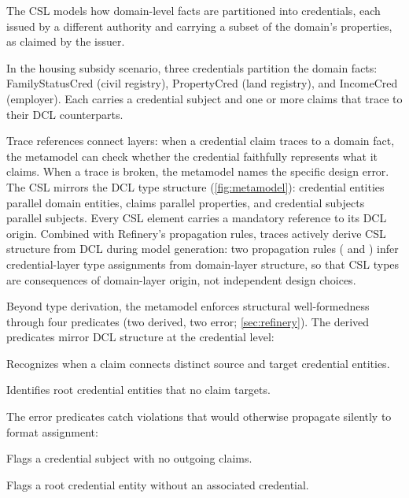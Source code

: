 The \acf{CSL} models how domain-level facts are partitioned into credentials, each issued by a different authority and carrying a subset of the domain's properties, as claimed by the issuer.

In the housing subsidy scenario, three credentials partition the domain facts: FamilyStatusCred (civil registry), PropertyCred (land registry), and IncomeCred (employer). Each carries a credential subject and one or more claims that trace to their \ac{DCL} counterparts.

Trace references connect layers: when a credential claim traces to a domain fact, the metamodel can check whether the credential faithfully represents what it claims. When a trace is broken, the metamodel names the specific design error. The \ac{CSL} mirrors the \ac{DCL} type structure (\autoref{fig:metamodel}): credential entities parallel domain entities, claims parallel properties, and credential subjects parallel subjects. Every \ac{CSL} element carries a mandatory  reference to its \ac{DCL} origin. Combined with Refinery's propagation rules, traces actively derive \ac{CSL} structure from \ac{DCL} during model generation: two propagation rules ( and ) infer credential-layer type assignments from domain-layer structure, so that \ac{CSL} types are consequences of domain-layer origin, not independent design choices.

Beyond type derivation, the metamodel enforces structural well-formedness through four predicates (two derived, two error; \autoref{sec:refinery}). The derived predicates mirror \ac{DCL} structure at the credential level:

\begin{description}
\tightlist
\item[credential\_statement: derived predicate]
Recognizes when a claim connects distinct source and target credential entities.
\item[Root\_cred\_entity: derived predicate]
Identifies root credential entities that no claim targets.
\end{description}

The error predicates catch violations that would otherwise propagate silently to format assignment:

\begin{description}
\tightlist
\item[no\_empty\_cred: error predicate]
Flags a credential subject with no outgoing claims.
\item[root\_ent\_doesnt\_have\_cred: error predicate]
Flags a root credential entity without an associated credential.
\end{description}


